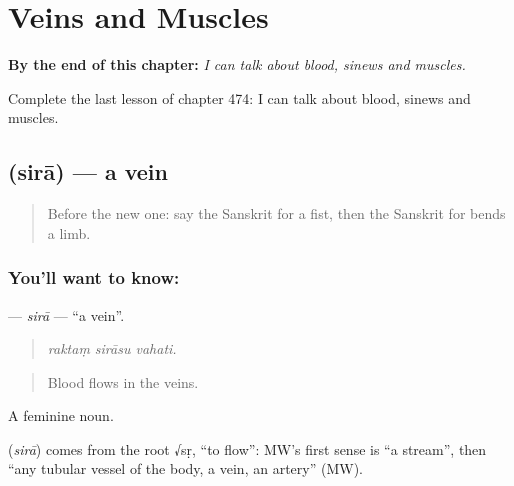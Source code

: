 
\chapter{Veins and Muscles}
\label{ch:sa-veins-and-muscles}

\begin{chapteropening}
\textbf{By the end of this chapter:} \emph{I can talk about blood, sinews and muscles.}

Complete the last lesson of chapter 474: I can talk about blood, sinews and muscles.
\end{chapteropening}

\section[\texorpdfstring{\sk{सिरा} (sirā)}{सिरा (sirā)}]{ (sirā) — a vein}

\label{lesson:SA-C474-sira}



\begin{quote}
Before the new one: say the Sanskrit for a fist, then the Sanskrit for bends a limb.
\end{quote}

\subsection*{You'll want to know: }
\textbf{} — \emph{sirā} — \textquotedblleft{}a vein\textquotedblright{}.

\begin{quote}
  
\end{quote}

\begin{quote}
\emph{raktaṃ sirāsu vahati.}
\end{quote}

\begin{quote}
Blood flows in the veins.
\end{quote}

A feminine noun.

\begin{cousinweb}
\textbf{} (\emph{sirā}) comes from the root √sṛ, \textquotedblleft{}to flow\textquotedblright{}: MW's first sense is \textquotedblleft{}a stream\textquotedblright{}, then \textquotedblleft{}any tubular vessel of the body, a vein, an artery\textquotedblright{} (MW).
\end{cousinweb}


